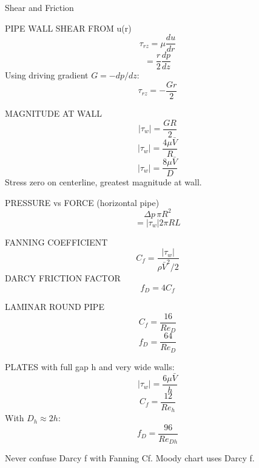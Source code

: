 Shear and Friction

PIPE WALL SHEAR FROM u(r)
$$\tau_{rz}=\mu\frac{du}{dr}$$
$$=\frac{r}{2}\frac{dp}{dz}$$
Using driving gradient $G=-dp/dz$:
$$\tau_{rz}=-\frac{Gr}{2}$$

MAGNITUDE AT WALL
$$|\tau_w|=\frac{GR}{2}$$
$$|\tau_w|=\frac{4\mu\bar V}{R}$$
$$|\tau_w|=\frac{8\mu\bar V}{D}$$
Stress zero on centerline, greatest magnitude at wall.

PRESSURE vs FORCE (horizontal pipe)
$$\Delta p\,\pi R^2$$
$$=|\tau_w|2\pi RL$$

FANNING COEFFICIENT
$$C_f=\frac{|\tau_w|}{\rho\bar V^2/2}$$
DARCY FRICTION FACTOR
$$f_D=4C_f$$

LAMINAR ROUND PIPE
$$C_f=\frac{16}{Re_D}$$
$$f_D=\frac{64}{Re_D}$$

PLATES with full gap h and very wide walls:
$$|\tau_w|=\frac{6\mu\bar V}{h}$$
$$C_f=\frac{12}{Re_h}$$
With $D_h\approx 2h$:
$$f_D=\frac{96}{Re_{Dh}}$$

Never confuse Darcy f with Fanning Cf. Moody chart uses Darcy f.
